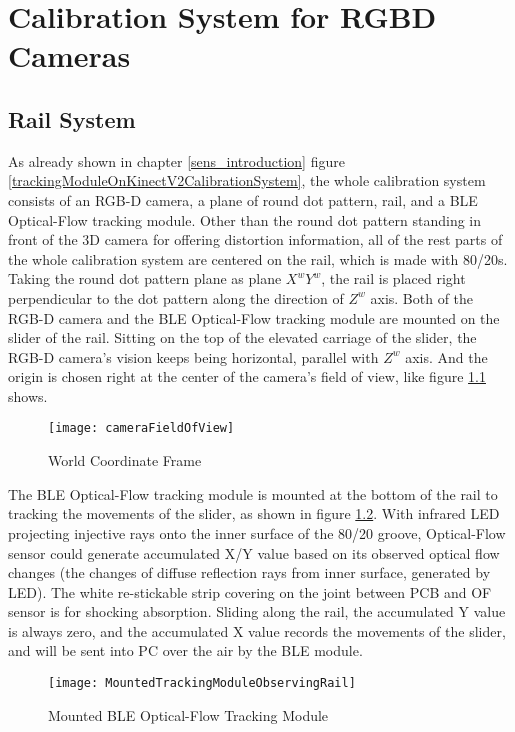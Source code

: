 \chapter{Calibration System for RGBD Cameras} %
\label{sens_CalibrationSystem} %
%
%
\section{Rail System}%
As already shown in chapter \ref{sens_introduction} figure \ref{trackingModuleOnKinectV2CalibrationSystem}, the whole calibration system consists of an RGB-D camera, a plane of round dot pattern, rail, and a BLE Optical-Flow tracking module. 
Other than the round dot pattern standing in front of the 3D camera for offering distortion information, all of the rest parts of the whole calibration system are centered on the rail, which is made with 80/20s. Taking the round dot pattern plane as plane \(X^wY^w\), the rail is placed right perpendicular to the dot pattern along the direction of \(Z^w\) axis. Both of the RGB-D camera and the BLE Optical-Flow tracking module are mounted on the slider of the rail. Sitting on the top of the elevated carriage of the slider, the RGB-D camera's vision keeps being horizontal, parallel with \(Z^w\) axis. And the origin is chosen right at the center of the camera's field of view, like figure \ref{cameraFieldOfView} shows.\par
%
\begin{figure}[h]
\centering
\texttt{[image: cameraFieldOfView]}
\caption{World Coordinate Frame}
\label{cameraFieldOfView}
\end{figure}%
%
\noindent
The BLE Optical-Flow tracking module is mounted at the bottom of the rail to tracking the movements of the slider, as shown in figure \ref{MountedTrackingModuleObservingRail}. With infrared LED projecting injective rays onto the inner surface of the 80/20 groove, Optical-Flow sensor could generate accumulated X/Y value based on its observed optical flow changes (the changes of diffuse reflection rays from inner surface, generated by LED). The white re-stickable strip covering on the joint between PCB and OF sensor is for shocking absorption. Sliding along the rail, the accumulated Y value is always zero, and the accumulated X value records the movements of the slider, and will be sent into PC over the air by the BLE module. 
%
\par
%
\begin{figure}[h]
\centering
\texttt{[image: MountedTrackingModuleObservingRail]}
\caption{Mounted BLE Optical-Flow Tracking Module}
\label{MountedTrackingModuleObservingRail}
\end{figure}%
%
%
%
